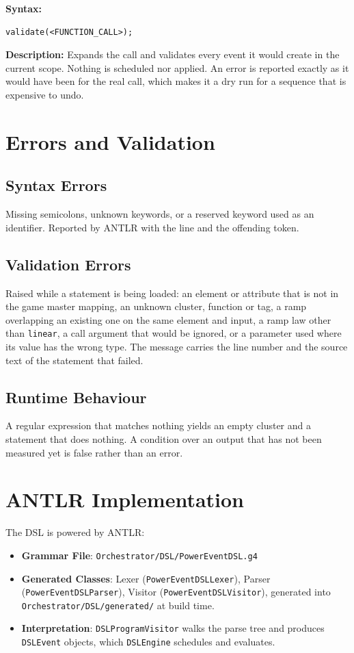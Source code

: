 \documentclass[12pt]{article}
\begin{document}
\textbf{Syntax:}
\begin{lstlisting}
validate(<FUNCTION_CALL>);
\end{lstlisting}

\textbf{Description:} Expands the call and validates every event it would create in the current scope. Nothing is scheduled nor applied. An error is reported exactly as
it would have been for the real call, which makes it a dry run for a sequence that is expensive to undo.

\section{Errors and Validation}

\subsection{Syntax Errors}

Missing semicolons, unknown keywords, or a reserved keyword used as an identifier. Reported by ANTLR with the line and the offending token.

\subsection{Validation Errors}

Raised while a statement is being loaded: an element or attribute that is not in the game master mapping, an unknown cluster, function or tag, a ramp overlapping an existing one on the same element and input, a ramp law other than \texttt{linear}, a call argument that would be ignored, or a parameter used where its value has the wrong type. The message carries the line number and the source text of the statement that failed.

\subsection{Runtime Behaviour}

A regular expression that matches nothing yields an empty cluster and a statement that does nothing. A condition over an output that has not been measured yet is false rather than an error.

\section{ANTLR Implementation}

The DSL is powered by ANTLR:
\begin{itemize}
  \item \textbf{Grammar File}: \texttt{Orchestrator/DSL/PowerEventDSL.g4}
  \item \textbf{Generated Classes}: Lexer (\texttt{PowerEventDSLLexer}), Parser (\texttt{PowerEventDSLParser}), Visitor (\texttt{PowerEventDSLVisitor}), generated into \texttt{Orchestrator/DSL/generated/} at build time.
  \item \textbf{Interpretation}: \texttt{DSLProgramVisitor} walks the parse tree and produces \texttt{DSLEvent} objects, which \texttt{DSLEngine} schedules and evaluates.
\end{itemize}
\end{document}
